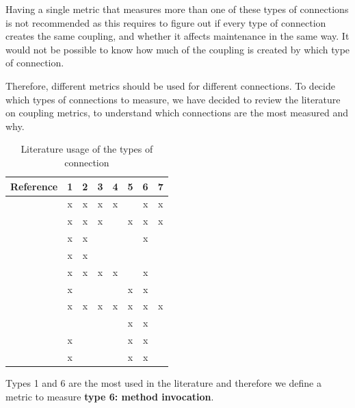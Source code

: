 \documentclass[a4paper]{article}
\begin{document}
Having a single metric that measures more than one of these types of connections is not recommended as this requires to figure out if every type of connection creates the same coupling, and whether it affects maintenance in the same way. It would not be possible to know how much of the coupling is created by which type of connection.

Therefore, different metrics should be used for different connections.
To decide which types of connections to measure, %
we have decided to review the literature on coupling metrics, to understand which connections are the most measured and why.

\begin{table}[ht!]
    \centering
    \begin{tabular}{|l|c|c|c|c|c|c|c|}
         \hline
         Reference                      & 1 & 2 & 3 & 4 & 5 & 6 & 7 \\\hline
         \cite{eder1994coupling}        & x & x & x & x &   & x & x \\\hline
         \cite{hitz1995measuring}       & x & x & x &   & x & x & x \\\hline
         \cite{briand1997investigation} & x & x &   &   &   & x &   \\\hline
         \cite{wilkie2000coupling}      & x & x &   &   &   &   &   \\\hline
         \cite{yang2005detecting}       & x & x & x & x &   & x &   \\\hline
         \cite{gui2007ranking}          & x &   &   &   & x & x &   \\\hline
         \cite{gupta2009package}        & x & x & x & x & x & x & x \\\hline
         \cite{harrison1998coupling}    &   &   &   &   & x & x &   \\\hline
         \cite{du2004refactoring}       & x &   &   &   & x & x &   \\\hline
         \cite{koetter2019assessing}    & x &   &   &   & x & x &   \\\hline
    \end{tabular}
    \caption{Literature usage of the types of connection}
    \label{tab:type-con-literature}
\end{table}

 Types 1 and 6 are the most used in the literature and therefore we define a metric to measure \textbf{type 6: method invocation}.
\end{document}
